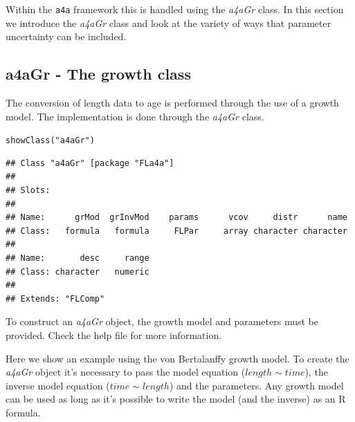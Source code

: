 \documentclass[a4paper,english,10pt]{article}\usepackage[]{graphicx}\usepackage[]{color}
\makeatletter
\newcommand{\hlstr}[1]{\textcolor[rgb]{0.2,0.2,0.2}{#1}}%
\newcommand{\hlstd}[1]{\textcolor[rgb]{0,0,0}{#1}}%
\newcommand{\hlkwd}[1]{\textcolor[rgb]{0.361,0.506,0.596}{#1}}%
\newenvironment{kframe}{%
 \def\at@end@of@kframe{}%
 \ifinner\ifhmode%
  \def\at@end@of@kframe{\end{minipage}}%
  \begin{minipage}{\columnwidth}%
 \fi\fi%
 \def\FrameCommand##1{\hskip\@totalleftmargin \hskip-\fboxsep
 \colorbox{shadecolor}{##1}\hskip-\fboxsep
     \hskip-\linewidth \hskip-\@totalleftmargin \hskip\columnwidth}%
 \MakeFramed {\advance\hsize-\width
   \@totalleftmargin\z@ \linewidth\hsize
   \@setminipage}}%
 {\par\unskip\endMakeFramed%
 \at@end@of@kframe}
\newenvironment{knitrout}{}{} %
\newcommand{\initiative}[1]{{\texttt{#1}}}
\newcommand{\class}[1]{{\textit{#1}}}
\makeatother
\begin{document}
Within the \initiative{a4a} framework this is handled using the \class{a4aGr} class. In this section we introduce the \class{a4aGr} class and look at the variety of ways that parameter uncertainty can be included.

\subsection{a4aGr - The growth class}

The conversion of length data to age is performed through the use of a growth model. The implementation is done through the \class{a4aGr} class.

\begin{knitrout}
\color{fgcolor}\begin{kframe}
\begin{alltt}
\hlkwd{showClass}\hlstd{(}\hlstr{"a4aGr"}\hlstd{)}
\end{alltt}
\begin{verbatim}
## Class "a4aGr" [package "FLa4a"]
## 
## Slots:
##                                                                   
## Name:      grMod  grInvMod    params      vcov     distr      name
## Class:   formula   formula     FLPar     array character character
##                           
## Name:       desc     range
## Class: character   numeric
## 
## Extends: "FLComp"
\end{verbatim}
\end{kframe}
\end{knitrout}

To construct an \class{a4aGr} object, the growth model and parameters must be provided.
Check the help file for more information.

Here we show an example using the von Bertalanffy growth model. To create the \class{a4aGr} object it's necessary to pass the model equation ($length \sim time$), the inverse model equation ($time \sim length$) and the parameters. Any growth model can be used as long as it's possible to write the model (and the inverse) as an R formula.
\end{document}
